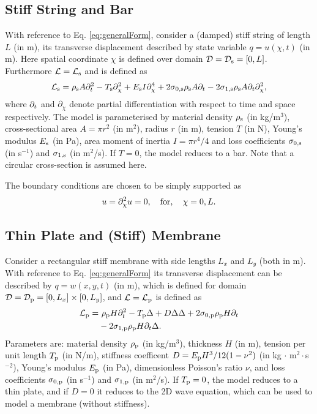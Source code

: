 \documentclass{article}
\begin{document}
\subsection{Stiff String and Bar}
With reference to Eq. \eqref{eq:generalForm}, consider a (damped) stiff string of length $L$ (in m), its transverse displacement described by state variable $q = u(\chi, t)$ (in m). Here spatial coordinate $\chi$ is defined over domain $\mathcal{D} = \mathcal{D}_{\text{s}} = [0, L]$. Furthermore $\mathcal{L} = \mathcal{L}_{\text{s}}$ and is defined as \cite{Bensa2003}
\begin{equation}\label{eq:stiffString}
    \mathcal{L}_\stxt = \rho_\stxt A\ptt - T_\stxt \pcc + E_\stxt I \pcccc + 2\szX[\stxt]\rho_\stxt A\pt - 2 \soX[\stxt]\rho_\stxt A\pt\pcc,
\end{equation}
where $\partial_t$ and $\partial_\chi$ denote partial differentiation with respect to time and space respectively. The model is parameterised by material density $\rho_{\text{s}}$ (in kg/m$^3$), cross-sectional area $A = \pi r^2$ (in m$^2$), radius $r$ (in m), tension $T$ (in N), Young's modulus $E_{\text{s}}$ (in Pa), area moment of inertia $I = \pi r^4/4$ and loss coefficients $\szX[\stxt]$ (in s$^{-1}$) and $\soX[\stxt]$ (in m$^2$/s). If $T=0$, the model reduces to a bar. Note that a circular cross-section is assumed here. 

The boundary conditions are chosen to be simply supported as
\begin{equation}
    u = \partial_{\chi}^2 u = 0, \quad \text{for}, \quad \chi = 0, L.
\end{equation}

\subsection{Thin Plate and (Stiff) Membrane}
Consider a rectangular stiff membrane with side lengths $L_x$ and $L_y$ (both in m). With reference to Eq. \eqref{eq:generalForm} its transverse displacement can be described by $q = w(x, y, t)$ (in m), which is defined for domain
$\mathcal{D} = \mathcal{D}_{\text{p}} = [0, L_x] \times [0, L_y]$, and $\mathcal{L} = \mathcal{L}_{\text{p}}$ is defined as \cite{Fletcher1998}
\begin{equation}\label{eq:stiffMembrane}
    \begin{aligned}
        \mathcal{L}_\ptxt = &\ \rho_\ptxt H\ptt - T_\ptxt \Delta + D \Delta\Delta+ 2\szX[\ptxt]\rho_\ptxt H\pt \\
        & - 2 \soX[\ptxt]\rho_\ptxt H\pt\Delta.
    \end{aligned}
\end{equation}
Parameters are: material density $\rho_{\text{p}}$ (in kg/m$^3$), thickness $H$ (in m), tension per unit length $T_{\text{p}}$ (in N/m), stiffness coefficent $D = E_{\text{p}} H^3 / 12 (1-\nu^2)$ (in kg $\cdot$ m$^2\cdot$s$^{-2}$), Young's modulus $E_{\text{p}}$ (in Pa), dimensionless Poisson's ratio $\nu$, and loss coefficients $\szX[\ptxt]$ (in s$^{-1}$) and $\soX[\ptxt]$ (in m$^2$/s).
If $T_{\text{p}} = 0$, the model reduces to a thin plate, and if $D=0$ it reduces to the 2D wave equation, which can be used to model a membrane (without stiffness).
\end{document}
